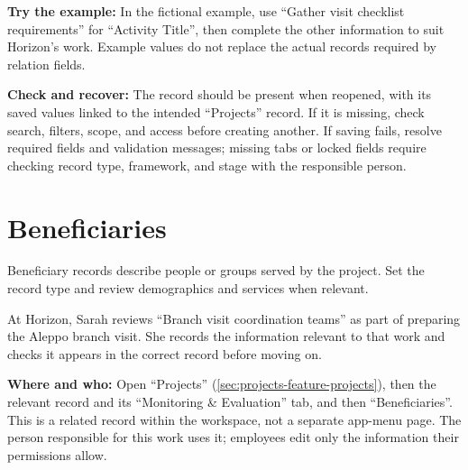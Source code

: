 \textbf{Try the example:} In the fictional example, use “Gather visit checklist requirements” for “Activity Title”, then complete the other information to suit Horizon's work. Example values do not replace the actual records required by relation fields.

\textbf{Check and recover:} The record should be present when reopened, with its saved values linked to the intended “Projects” record. If it is missing, check search, filters, scope, and access before creating another. If saving fails, resolve required fields and validation messages; missing tabs or locked fields require checking record type, framework, and stage with the responsible person.

\clearpage
\section{Beneficiaries}
\label{sec:projects-feature-beneficiaries}

Beneficiary records describe people or groups served by the project. Set the record type and review demographics and services when relevant.

\begin{rcnote}
At Horizon, Sarah reviews “Branch visit coordination teams” as part of preparing the Aleppo branch visit. She records the information relevant to that work and checks it appears in the correct record before moving on.
\end{rcnote}

\textbf{Where and who:} Open “Projects” (\ref{sec:projects-feature-projects}), then the relevant record and its “Monitoring \& Evaluation” tab, and then “Beneficiaries”. This is a related record within the workspace, not a separate app-menu page. The person responsible for this work uses it; employees edit only the information their permissions allow.


